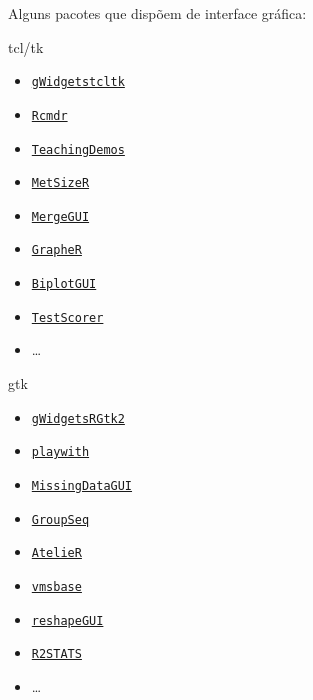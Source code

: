 \begin{frame}

  Alguns pacotes que dispõem de interface gráfica:

  \begin{multicols}{2}
    \begin{block}{tcl/tk}
      \begin{itemize}
        \itemsep1pt\parskip0pt
      \item \href{http://cran.r-project.org/web/packages/gWidgetstcltk/index.html}{\texttt{gWidgetstcltk}}
      \item \href{http://cran.r-project.org/web/packages/Rcmdr/index.html}{\texttt{Rcmdr}}
      \item \href{http://cran.r-project.org/web/packages/TeachingDemos/index.html}{\texttt{TeachingDemos}}
      \item \href{http://cran.r-project.org/web/packages/MetSizeR/index.html}{\texttt{MetSizeR}}
      \item \href{http://cran.r-project.org/web/packages/MergeGUI/index.html}{\texttt{MergeGUI}}
      \item \href{http://cran.r-project.org/web/packages/GrapheR/index.html}{\texttt{GrapheR}}
      \item \href{http://cran.r-project.org/web/packages/BiplotGUI/index.html}{\texttt{BiplotGUI}}
      \item \href{http://cran.r-project.org/web/packages/TestScorer/index.html}{\texttt{TestScorer}}
      \item \ldots
      \end{itemize}
    \end{block}
    \vfill
    \columnbreak
    \begin{block}{gtk}
      \begin{itemize}
        \itemsep1pt\parskip0pt
      \item \href{http://cran.r-project.org/web/packages/gWidgetsRGtk2/index.html}{\texttt{gWidgetsRGtk2}}
      \item \href{http://cran.r-project.org/web/packages/playwith/index.html}{\texttt{playwith}}
      \item \href{http://cran.r-project.org/web/packages/MissingDataGUI/index.html}{\texttt{MissingDataGUI}}
      \item \href{http://cran.r-project.org/web/packages/GroupSeq/index.html}{\texttt{GroupSeq}}
      \item \href{http://cran.r-project.org/web/packages/AtelieR/index.html}{\texttt{AtelieR}}
      \item \href{http://cran.r-project.org/web/packages/vmsbase/index.html}{\texttt{vmsbase}}
      \item \href{http://cran.r-project.org/web/packages/reshapeGUI/index.html}{\texttt{reshapeGUI}}
      \item \href{http://cran.r-project.org/web/packages/R2STATS/index.html}{\texttt{R2STATS}}
      \item \ldots
      \end{itemize}
    \end{block}
  \end{multicols}
  
\end{frame}
